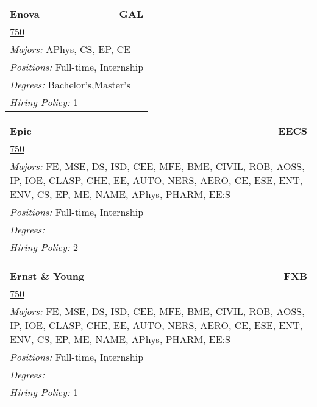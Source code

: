 \documentclass[twoside]{article}
\begin{document}
\begin{center}
\begin{multicols}{3}
\begin{FlushLeft}
\begin{minipage}{\columnwidth}
\end{minipage}
 
\begin{minipage}{\columnwidth}\begin{tabularx}{.95\columnwidth}{Xr}
                 {\Large\bf Enova} & {\Large\bf GAL}\\
    \multicolumn{2}{p{.95\columnwidth}}{\url{750}}\\
    \multicolumn{2}{p{.95\columnwidth}}{\emph{Majors:} APhys, CS, EP, CE}\\
    \multicolumn{2}{p{.95\columnwidth}}{\emph{Positions:} Full-time, Internship}\\
    \multicolumn{2}{p{.95\columnwidth}}{\emph{Degrees:} Bachelor's,Master's}\\
    \multicolumn{2}{p{.95\columnwidth}}{\emph{Hiring Policy:} 1}\\
    \end{tabularx}
    
\end{minipage}
 
\begin{minipage}{\columnwidth}\begin{tabularx}{.95\columnwidth}{Xr}
                 {\Large\bf Epic} & {\Large\bf EECS}\\
    \multicolumn{2}{p{.95\columnwidth}}{\url{750}}\\
    \multicolumn{2}{p{.95\columnwidth}}{\emph{Majors:} FE, MSE, DS, ISD, CEE, MFE, BME, CIVIL, ROB, AOSS, IP, IOE, CLASP, CHE, EE, AUTO, NERS, AERO, CE, ESE, ENT, ENV, CS, EP, ME, NAME, APhys, PHARM, EE:S}\\
    \multicolumn{2}{p{.95\columnwidth}}{\emph{Positions:} Full-time, Internship}\\
    \multicolumn{2}{p{.95\columnwidth}}{\emph{Degrees:} }\\
    \multicolumn{2}{p{.95\columnwidth}}{\emph{Hiring Policy:} 2}\\
    \end{tabularx}
    
\end{minipage}
 
\begin{minipage}{\columnwidth}\begin{tabularx}{.95\columnwidth}{Xr}
                 {\Large\bf Ernst \& Young} & {\Large\bf FXB}\\
    \multicolumn{2}{p{.95\columnwidth}}{\url{750}}\\
    \multicolumn{2}{p{.95\columnwidth}}{\emph{Majors:} FE, MSE, DS, ISD, CEE, MFE, BME, CIVIL, ROB, AOSS, IP, IOE, CLASP, CHE, EE, AUTO, NERS, AERO, CE, ESE, ENT, ENV, CS, EP, ME, NAME, APhys, PHARM, EE:S}\\
    \multicolumn{2}{p{.95\columnwidth}}{\emph{Positions:} Full-time, Internship}\\
    \multicolumn{2}{p{.95\columnwidth}}{\emph{Degrees:} }\\
    \multicolumn{2}{p{.95\columnwidth}}{\emph{Hiring Policy:} 1}\\
    \end{tabularx}
    

\end{minipage}
\end{FlushLeft}
\end{multicols}
\end{center}
\end{document}
